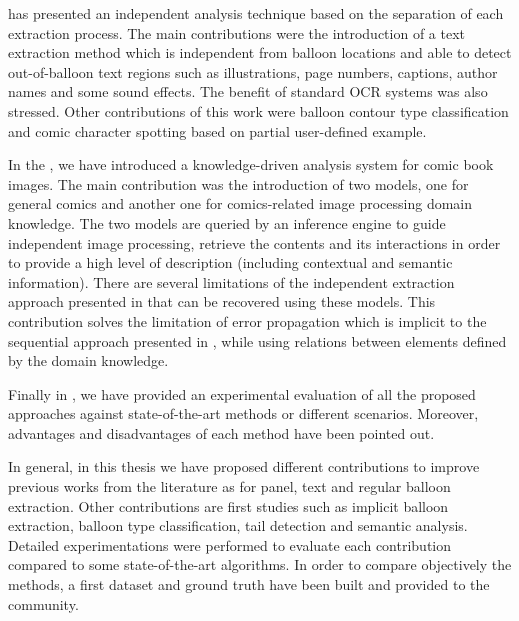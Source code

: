  has presented an independent analysis technique based on the separation of each extraction process.
The main contributions were the introduction of a text extraction method which is independent from balloon locations and able to detect out-of-balloon text regions such as illustrations, page numbers, captions, author names and some sound effects.
The benefit of standard OCR systems was also stressed.
Other contributions of this work were balloon contour type classification and comic character spotting based on partial user-defined example.

In the , we have introduced a knowledge-driven analysis system for comic book images.
The main contribution was the introduction of two models, one for general comics and another one for comics-related image processing domain knowledge.
The two models are queried by an inference engine to guide independent image processing, retrieve the contents and its interactions in order to provide a high level of description (including contextual and semantic information).
There are several limitations of the independent extraction approach presented in  that can be recovered using these models.
This contribution solves the limitation of error propagation which is implicit to the sequential approach presented in , while using relations between elements defined by the domain knowledge.

Finally in , we have provided an experimental evaluation of all the proposed approaches against state-of-the-art methods or different scenarios.
Moreover, advantages and disadvantages of each method have been pointed out.

In general, in this thesis we have proposed different contributions to improve previous works from the literature as for panel, text and regular balloon extraction.
Other contributions are first studies such as implicit balloon extraction, balloon type classification, tail detection and semantic analysis.
Detailed experimentations were performed to evaluate each contribution compared to some state-of-the-art algorithms.
In order to compare objectively the methods, a first dataset and ground truth have been built and provided to the community.

